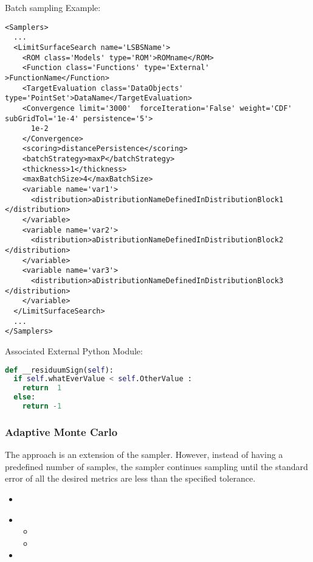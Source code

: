 Batch sampling Example:
\begin{lstlisting}[style=XML,morekeywords={class,limit,subGridTol,weight,persistence}]
<Samplers>
  ...
  <LimitSurfaceSearch name='LSBSName'>
    <ROM class='Models' type='ROM'>ROMname</ROM>
    <Function class='Functions' type='External' >FunctionName</Function>
    <TargetEvaluation class='DataObjects' type='PointSet'>DataName</TargetEvaluation>
    <Convergence limit='3000'  forceIteration='False' weight='CDF'  subGridTol='1e-4' persistence='5'>
      1e-2
    </Convergence>
    <scoring>distancePersistence</scoring>
    <batchStrategy>maxP</batchStrategy>
    <thickness>1</thickness>
    <maxBatchSize>4</maxBatchSize>
    <variable name='var1'>
      <distribution>aDistributionNameDefinedInDistributionBlock1 </distribution>
    </variable>
    <variable name='var2'>
      <distribution>aDistributionNameDefinedInDistributionBlock2 </distribution>
    </variable>
    <variable name='var3'>
      <distribution>aDistributionNameDefinedInDistributionBlock3 </distribution>
    </variable>
  </LimitSurfaceSearch>
  ...
</Samplers>
\end{lstlisting}

Associated External Python Module:
\begin{lstlisting}[language=python]
def __residuumSign(self):
  if self.whatEverValue < self.OtherValue :
    return  1
  else:
    return -1
\end{lstlisting}

\subsubsection{Adaptive Monte Carlo}
\label{subsubsubsec:ADMC}
The  approach is an extension of the  sampler.
However, instead of having a predefined number of samples, the  sampler continues sampling until the standard error of all the desired metrics are less than the specified tolerance.
%

%
\begin{itemize}
  \itemsep0em
  \item \nameDescription
\end{itemize}

\begin{itemize}
\item \variableDescription
  \variableChildrenIntro
  \begin{itemize}
    \item \distributionDescription
    \item \functionDescription
  \end{itemize}
  \item \constantVariablesDescription
\end{itemize}

